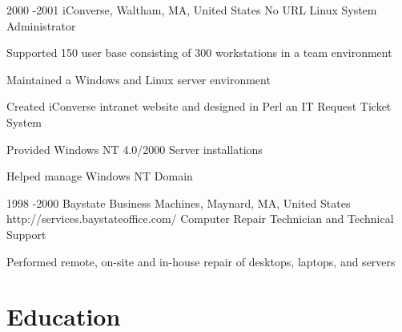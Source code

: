 \documentclass[10pt]{article} %
\begin{document}
\job
{2000 -}{2001}
{iConverse, Waltham, MA, United States}
{No URL}
{Linux System Administrator}
{\begin{itemize-noindent}
\item{Supported 150 user base consisting of 300 workstations in a team environment}
\item{Maintained a Windows and Linux server environment}
\item{Created iConverse intranet website and designed in Perl an IT Request Ticket System}
\item{Provided Windows NT 4.0/2000 Server installations}
\item{Helped manage Windows NT Domain}
\end{itemize-noindent}}

\job
{1998 -}{2000}
{Baystate Business Machines, Maynard, MA, United States}
{http://services.baystateoffice.com/}
{Computer Repair Technician and Technical Support}
{\begin{itemize-noindent}
\item{Performed remote, on-site and in-house repair of desktops, laptops, and servers}
\end{itemize-noindent}}
\section{Education}
\end{document}
